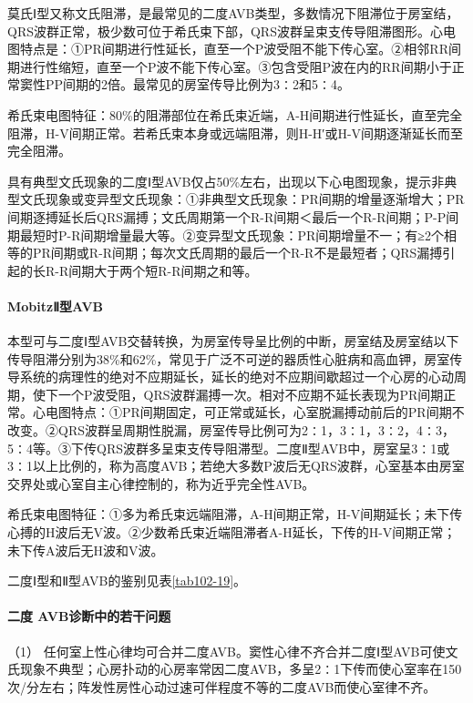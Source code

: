 莫氏Ⅰ型又称文氏阻滞，是最常见的二度AVB类型，多数情况下阻滞位于房室结，QRS波群正常，极少数可位于希氏束下部，QRS波群呈束支传导阻滞图形。心电图特点是：①PR间期进行性延长，直至一个P波受阻不能下传心室。②相邻RR间期进行性缩短，直至一个P波不能下传心室。③包含受阻P波在内的RR间期小于正常窦性PP间期的2倍。最常见的房室传导比例为3∶2和5∶4。

希氏束电图特征：80\%的阻滞部位在希氏束近端，A-H间期进行性延长，直至完全阻滞，H-V间期正常。若希氏束本身或远端阻滞，则H-H′或H-V间期逐渐延长而至完全阻滞。

具有典型文氏现象的二度Ⅰ型AVB仅占50\%左右，出现以下心电图现象，提示非典型文氏现象或变异型文氏现象：①非典型文氏现象：PR间期的增量逐渐增大；PR间期逐搏延长后QRS漏搏；文氏周期第一个R-R间期＜最后一个R-R间期；P-P间期最短时P-R间期增量最大等。②变异型文氏现象：PR间期增量不一；有≥2个相等的PR间期或R-R间期；每次文氏周期的最后一个R-R不是最短者；QRS漏搏引起的长R-R间期大于两个短R-R间期之和等。

\paragraph{MobitzⅡ型AVB}

本型可与二度Ⅰ型AVB交替转换，为房室传导呈比例的中断，房室结及房室结以下传导阻滞分别为38\%和62\%，常见于广泛不可逆的器质性心脏病和高血钾，房室传导系统的病理性的绝对不应期延长，延长的绝对不应期间歇超过一个心房的心动周期，使下一个P波受阻，QRS波群漏搏一次。相对不应期不延长表现为PR间期正常。心电图特点：①PR间期固定，可正常或延长，心室脱漏搏动前后的PR间期不改变。②QRS波群呈周期性脱漏，房室传导比例可为2∶1，3∶1，3∶2，4∶3，5∶4等。③下传QRS波群多呈束支传导阻滞型。二度Ⅱ型AVB中，房室呈3∶1或3∶1以上比例的，称为高度AVB；若绝大多数P波后无QRS波群，心室基本由房室交界处或心室自主心律控制的，称为近乎完全性AVB。

希氏束电图特征：①多为希氏束远端阻滞，A-H间期正常，H-V间期延长；未下传心搏的H波后无V波。②少数希氏束近端阻滞者A-H延长，下传的H-V间期正常；未下传A波后无H波和V波。

二度Ⅰ型和Ⅱ型AVB的鉴别见表\ref{tab102-19}。

\paragraph{二度 AVB诊断中的若干问题}

（1）
任何室上性心律均可合并二度AVB。窦性心律不齐合并二度Ⅰ型AVB可使文氏现象不典型；心房扑动的心房率常因二度AVB，多呈2∶1下传而使心室率在150次/分左右；阵发性房性心动过速可伴程度不等的二度AVB而使心室律不齐。

